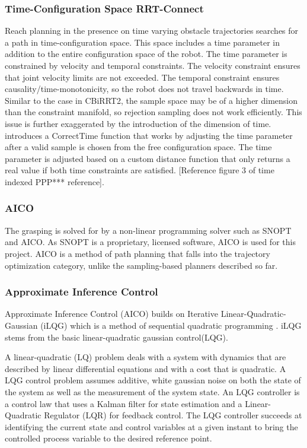 \documentclass[12pt]{article}
\begin{document}
        \subsubsection{Time-Configuration Space RRT-Connect}
            Reach planning in the presence on time varying obstacle trajectories searches for a path in time-configuration space. This space includes a time parameter in addition to the entire configuration space of the robot. The time parameter is constrained by velocity and temporal constraints. The velocity constraint ensures that joint velocity limits are not exceeded. The temporal constraint ensures causality/time-monotonicity, so the robot does not travel backwards in time. Similar to the case in CBiRRT2, the sample space may be of a higher dimension than the constraint manifold, so rejection sampling does not work efficiently. This issue is further exaggerated by the introduction of the dimension of time. \cite{yang_planning_2018} introduces a CorrectTime function that works by adjusting the time parameter after a valid sample is chosen from the free configuration space. The time parameter is adjusted based on a custom distance function that only returns a real value if both time constraints are satisfied. [Reference figure 3 of time indexed PPP*** reference].

        \subsubsection{AICO}
            The grasping is solved for by a non-linear programming solver such as SNOPT and AICO. As SNOPT is a proprietary, licensed software, AICO is used for this project. AICO is a method of path planning that falls into the trajectory optimization category, unlike the sampling-based planners described so far.

        \subsubsection{Approximate Inference Control}
            Approximate Inference Control (AICO) \cite{toussaint_robot_2009} builds on Iterative Linear-Quadratic-Gaussian (iLQG) which is a method of sequential quadratic programming \cite{todorov_generalized_2005}. iLQG stems from the basic linear-quadratic gaussian control(LQG).

            \par A linear-quadratic (LQ) problem deals with a system with dynamics that are described by linear differential equations and with a cost that is quadratic. A LQG control problem assumes additive, white gaussian noise on both the state of the system as well as the measurement of the system state. An LQG controller is a control law that uses a Kalman filter for state estimation and a Linear-Quadratic Regulator (LQR) for feedback control. The LQG controller succeeds at identifying the current state and control variables at a given instant to bring the controlled process variable to the desired reference point.
\end{document}
